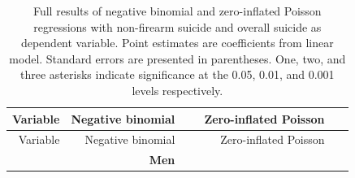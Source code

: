 \documentclass[]{article}
\begin{document}
\begin{longtable}[c]{@{}rrrrr@{}}
\caption{Full results of negative binomial and zero-inflated Poisson
regressions with non-firearm suicide and overall suicide as dependent
variable. Point estimates are coefficients from linear model. Standard
errors are presented in parentheses. One, two, and three asterisks
indicate significance at the 0.05, 0.01, and 0.001 levels
respectively.}\tabularnewline
\toprule
\begin{minipage}[b]{0.17\columnwidth}\raggedleft\strut
Variable
\strut\end{minipage} &
\begin{minipage}[b]{0.18\columnwidth}\raggedleft\strut
Negative binomial
\strut\end{minipage} &
\begin{minipage}[b]{0.16\columnwidth}\raggedleft\strut
~
\strut\end{minipage} &
\begin{minipage}[b]{0.21\columnwidth}\raggedleft\strut
Zero-inflated Poisson
\strut\end{minipage} &
\begin{minipage}[b]{0.15\columnwidth}\raggedleft\strut
~
\strut\end{minipage}\tabularnewline
\midrule
\endfirsthead
\toprule
\begin{minipage}[b]{0.17\columnwidth}\raggedleft\strut
Variable
\strut\end{minipage} &
\begin{minipage}[b]{0.18\columnwidth}\raggedleft\strut
Negative binomial
\strut\end{minipage} &
\begin{minipage}[b]{0.16\columnwidth}\raggedleft\strut
~
\strut\end{minipage} &
\begin{minipage}[b]{0.21\columnwidth}\raggedleft\strut
Zero-inflated Poisson
\strut\end{minipage} &
\begin{minipage}[b]{0.15\columnwidth}\raggedleft\strut
~
\strut\end{minipage}\tabularnewline
\midrule
\endhead
\begin{minipage}[t]{0.17\columnwidth}\raggedleft\strut
\strut\end{minipage} &
\begin{minipage}[t]{0.18\columnwidth}\raggedleft\strut
\textbf{Men}
\strut\end{minipage} &
\begin{minipage}[t]{0.16\columnwidth}\raggedleft\strut

\end{minipage}
\end{longtable}
\end{document}
